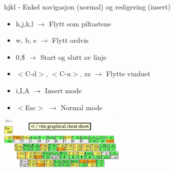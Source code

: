 \documentclass{beamer}
\begin{document}
\begin{frame}{hjkl - Enkel navigasjon (normal) og redigering (insert)}
	\begin{center}
		\begin{itemize}
			\item h,j,k,l $\rightarrow$ Flytt som piltastene
			\item w, b, e $\rightarrow$ Flytt ordvis
			\item 0,\$ $\rightarrow$ Start og slutt av linje
			\item $<$C-d$>$, $<$C-u$>$, zz $\rightarrow$ Flytte vinduet
			\item i,I,A $\rightarrow$ Insert mode
			\item $<$Esc$>$ $\rightarrow$ Normal mode
		\end{itemize}
		{\includegraphics[width=230px]{images/vim-cheat-sheet.png}}
	\end{center}
\end{frame}
\end{document}

